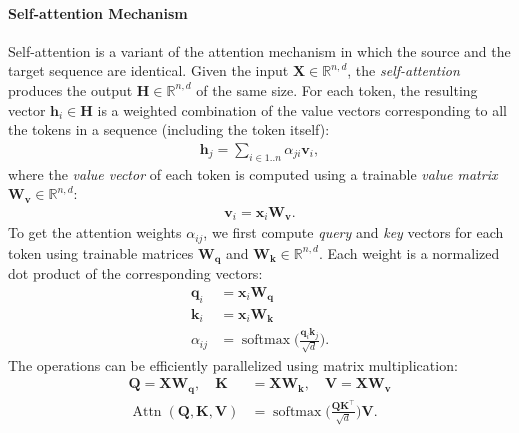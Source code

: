 {\paragraph{Self-attention Mechanism} Self-attention \cite{cheng2016long,vaswani2017attention} is a variant of the attention mechanism in which the source and the target sequence are identical. Given the input $\mathbf{X} \in \mathbb{R}^{n,d}$, the \emph{self-attention} produces the output $\mathbf{H} \in \mathbb{R}^{n,d}$ of the same size. For each token, the resulting vector $\mathbf{h}_i \in \mathbf{H}$ is a weighted combination of the value vectors corresponding to all the tokens in a sequence (including the token itself):
\begin{align}
    \mathbf{h}_j = \sum_{i\in 1..n} \alpha_{ji} \mathbf{v}_i,
\end{align}
where the \emph{value vector} of each token is computed using a trainable \emph{value matrix} $\mathbf{W_v} \in \mathbb{R}^{n,d}$:
\begin{align}
    \mathbf{v}_i = \mathbf{x}_i \mathbf{W_v}.
\end{align}
To get the attention weights $\alpha_{ij}$, we first compute \textit{query} and \textit{key} vectors for each token using trainable matrices $\mathbf{W_q}$ and $\mathbf{W_k} \in \mathbb{R}^{n,d}$. Each weight is a normalized dot product of the corresponding vectors:
\begin{align}
    \mathbf{q}_i & = \mathbf{x}_i \mathbf{W_q}                                                      \\
    \mathbf{k}_i & = \mathbf{x}_i \mathbf{W_k}                                                      \\
    \alpha_{ij}  & = \operatorname{softmax}\biggl(\frac{\mathbf{q}_i\mathbf{k}_j}{\sqrt{d}}\biggr).
\end{align}
The operations can be efficiently parallelized using matrix multiplication:
\begin{align}
    \mathbf{Q}                                             = \mathbf{X}\mathbf{W_q},\quad\mathbf{K} & = \mathbf{X}\mathbf{W_k},\quad\mathbf{V} = \mathbf{X}\mathbf{W_v}                           \\
    \operatorname{Attn}(\mathbf{Q}, \mathbf{K}, \mathbf{V})                                         & = \operatorname{softmax}\biggl(\frac{\mathbf{Q}\mathbf{K}^\top}{\sqrt{d}}\biggr)\mathbf{V}.
\end{align}


}
